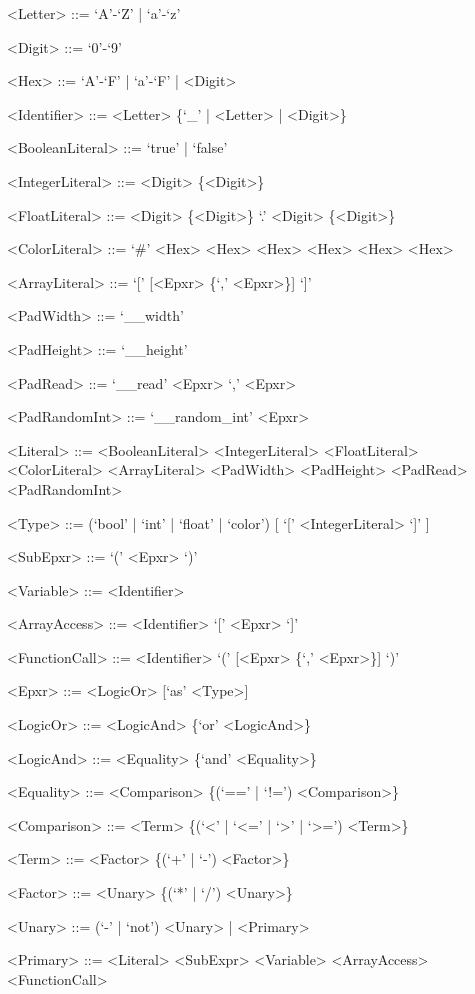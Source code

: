 \begin{center}
\begin{grammar}
<Letter> ::= `A'-`Z' | `a'-`z'

<Digit> ::= `0'-`9'

<Hex> ::= `A'-`F' | `a'-`F' | <Digit>

<Identifier> ::= <Letter> \{`\_' | <Letter> | <Digit>\}

<BooleanLiteral> ::= `true' | `false'

<IntegerLiteral> ::= <Digit> \{<Digit>\}

<FloatLiteral> ::= <Digit> \{<Digit>\} `.' <Digit> \{<Digit>\}

<ColorLiteral> ::= `\#' <Hex> <Hex> <Hex> <Hex> <Hex> <Hex>

<ArrayLiteral> ::= `[' [<Epxr> \{`,' <Epxr>\}] `]'

<PadWidth> ::= `\_\_width'

<PadHeight> ::= `\_\_height'

<PadRead> ::= `\_\_read' <Epxr> `,' <Epxr>

<PadRandomInt> ::= `\_\_random\_int' <Epxr>

<Literal> ::= <BooleanLiteral>
\alt <IntegerLiteral>
\alt <FloatLiteral>
\alt <ColorLiteral>
\alt <ArrayLiteral>
\alt <PadWidth>
\alt <PadHeight>
\alt <PadRead>
\alt <PadRandomInt>

<Type> ::= (`bool' | `int' | `float' | `color') [ `[' <IntegerLiteral> `]' ]

<SubEpxr> ::= `(' <Epxr> `)'

<Variable> ::= <Identifier>

<ArrayAccess> ::= <Identifier> `[' <Epxr> `]'

<FunctionCall> ::= <Identifier> `(' [<Epxr> \{`,' <Epxr>\}] `)'

<Epxr> ::= <LogicOr> [`as' <Type>]

<LogicOr> ::= <LogicAnd> \{`or' <LogicAnd>\}

<LogicAnd> ::= <Equality> \{`and' <Equality>\}

<Equality> ::= <Comparison> \{(`==' | `!=') <Comparison>\}

<Comparison> ::= <Term> \{(`<' | `<=' | `>' | `>=') <Term>\}

<Term> ::= <Factor> \{(`+' | `-') <Factor>\}

<Factor> ::= <Unary> \{(`*' | `/') <Unary>\}

<Unary> ::= (`-' | `not') <Unary> | <Primary>

<Primary> ::= <Literal>
\alt <SubExpr>
\alt <Variable>
\alt <ArrayAccess>
\alt <FunctionCall>


\end{grammar}
\end{center}
